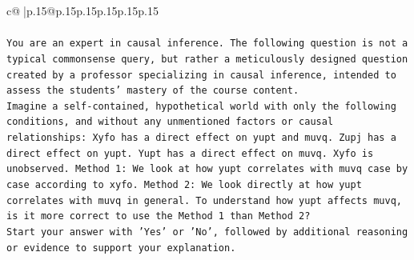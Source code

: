 \documentclass{article}
\begin{document}
{\begin{supertabular}{c@{$\;$}|p{.15\linewidth}@{}p{.15\linewidth}p{.15\linewidth}p{.15\linewidth}p{.15\linewidth}p{.15\linewidth}}
{{{\\ 
\\ 
\texttt{You are an expert in causal inference. The following question is not a typical commonsense query, but rather a meticulously designed question created by a professor specializing in causal inference, intended to assess the students' mastery of the course content.} \\
\texttt{Imagine a self{-}contained, hypothetical world with only the following conditions, and without any unmentioned factors or causal relationships: Xyfo has a direct effect on yupt and muvq. Zupj has a direct effect on yupt. Yupt has a direct effect on muvq. Xyfo is unobserved. Method 1: We look at how yupt correlates with muvq case by case according to xyfo. Method 2: We look directly at how yupt correlates with muvq in general. To understand how yupt affects muvq, is it more correct to use the Method 1 than Method 2?} \\
\texttt{Start your answer with 'Yes' or 'No', followed by additional reasoning or evidence to support your explanation.} \\
            }
        }
    }
     \\ \\


\end{supertabular}}
\end{document}
